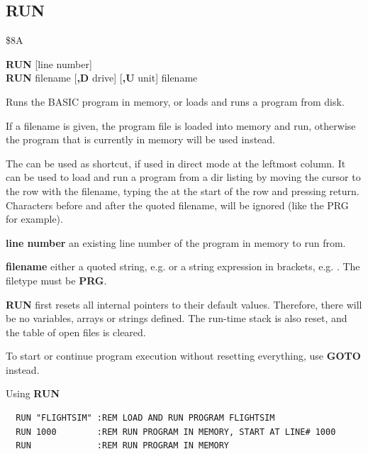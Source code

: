 
\newpage
\subsection{RUN}
\begin{description}[leftmargin=2cm,style=nextline]
\item [Token:] \$8A
\item [Format:] {\bf RUN} [line number] \\
                {\bf RUN} filename [{\bf,D} drive] [{\bf,U} unit]
                {\bf \screentext{$\uparrow$}} filename
\item [Usage:] Runs the BASIC program in memory, or loads and runs a program from disk.

   If a filename is given, the program file is loaded into
   memory and run, otherwise the program that is currently in memory
   will be used instead.

   The {\bf \screentext{$\uparrow$}} can be used as shortcut, if used
   in direct mode at the leftmost column. It can be used to load and run
   a program from a dir listing by moving the cursor to the
   row with the filename, typing the {\bf \screentext{$\uparrow$}} at the
   start of the row and pressing return. Characters before and after the
   quoted filename, will be ignored (like the PRG for example).

   {\bf line number} an existing line number of the program in memory to run from.

   {\bf filename} either a quoted string, e.g.  or
   a string expression in brackets, e.g. .
   The filetype must be {\bf PRG}.

   \drivedefinition

   \unitdefinition

   {\bf RUN} first resets all internal pointers to their
   default values. Therefore, there will be no variables, arrays
   or strings defined. The run-time stack is also reset, and the
   table of open files is cleared.

\item [Remarks:]
   To start or continue program execution without
   resetting everything, use {\bf GOTO} instead.

\item [Examples:] Using {\bf RUN}
\begin{tcolorbox}[colback=black,coltext=white]
\verbatimfont{\codefont}
\begin{verbatim}
  RUN "FLIGHTSIM" :REM LOAD AND RUN PROGRAM FLIGHTSIM
  RUN 1000        :REM RUN PROGRAM IN MEMORY, START AT LINE# 1000
  RUN             :REM RUN PROGRAM IN MEMORY
\end{verbatim}
\end{tcolorbox}
\end{description}

